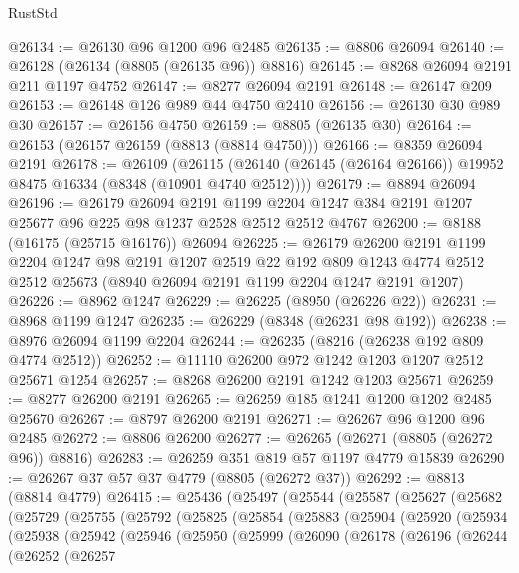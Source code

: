 \begin{lexlean}{RustStd}
\begin{coremodule}
@26134 := @26130 @96 @1200 @96 @2485
@26135 := @8806 @26094
@26140 := @26128 (@26134 (@8805 (@26135 @96)) @8816)
@26145 := @8268 @26094 @2191 @211 @1197 @4752
@26147 := @8277 @26094 @2191
@26148 := @26147 @209
@26153 := @26148 @126 @989 @44 @4750 @2410
@26156 := @26130 @30 @989 @30
@26157 := @26156 @4750
@26159 := @8805 (@26135 @30)
@26164 := @26153 (@26157 @26159 (@8813 (@8814 @4750)))
@26166 := @8359 @26094 @2191
@26178 := @26109
    (@26115 (@26140 (@26145 (@26164 @26166)) @19952 @8475 @16334 (@8348 (@10901 @4740 @2512))))
@26179 := @8894 @26094
@26196 := @26179
    @26094
    @2191
    @1199
    @2204
    @1247
    @384
    @2191
    @1207
    @25677
    @96
    @225
    @98
    @1237
    @2528
    @2512
    @2512
    @4767
@26200 := @8188 (@16175 (@25715 @16176)) @26094
@26225 := @26179
    @26200
    @2191
    @1199
    @2204
    @1247
    @98
    @2191
    @1207
    @2519
    @22
    @192
    @809
    @1243
    @4774
    @2512
    @2512
    @25673
    (@8940 @26094 @2191 @1199 @2204 @1247 @2191 @1207)
@26226 := @8962 @1247
@26229 := @26225 (@8950 (@26226 @22))
@26231 := @8968 @1199 @1247
@26235 := @26229 (@8348 (@26231 @98 @192))
@26238 := @8976 @26094 @1199 @2204
@26244 := @26235 (@8216 (@26238 @192 @809 @4774 @2512))
@26252 := @11110 @26200 @972 @1242 @1203 @1207 @2512 @25671 @1254
@26257 := @8268 @26200 @2191 @1242 @1203 @25671
@26259 := @8277 @26200 @2191
@26265 := @26259 @185 @1241 @1200 @1202 @2485 @25670
@26267 := @8797 @26200 @2191
@26271 := @26267 @96 @1200 @96 @2485
@26272 := @8806 @26200
@26277 := @26265 (@26271 (@8805 (@26272 @96)) @8816)
@26283 := @26259 @351 @819 @57 @1197 @4779 @15839
@26290 := @26267 @37 @57 @37 @4779 (@8805 (@26272 @37))
@26292 := @8813 (@8814 @4779)
@26415 := @25436
    (@25497
      (@25544
        (@25587
          (@25627
            (@25682
              (@25729
                (@25755
                  (@25792
                    (@25825
                      (@25854
                        (@25883
                          (@25904
                            (@25920
                              (@25934
                                (@25938
                                  (@25942
                                    (@25946
                                      (@25950
                                        (@25999
                                          (@26090
                                            (@26178
                                              (@26196
                                                (@26244
                                                  (@26252
                                                    (@26257

\end{coremodule}
\end{lexlean}
